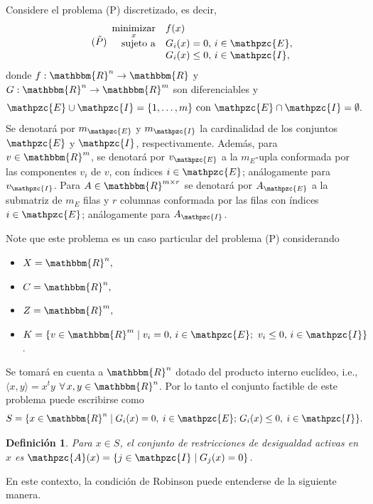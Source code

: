 \documentclass[a4paper,10pt]{book}
\newcommand{\R}{\mathbbm{R}}
\newcommand{\Rn}{\R^n}
\newcommand{\arr}{\rightarrow}
\newcommand{\cI}{\mathpzc{I}}
\newcommand{\cE}{\mathpzc{E}}
\newcommand{\cA}{\mathpzc{A}}
\newcommand{\la}{\langle}
\newcommand{\ra}{\rangle}
\newtheorem{defi}[teo]{Definici\'on}
\begin{document}
Considere el problema (P) discretizado, es decir,
\[\tag{$\tilde{P}$}
\begin{array}{rl}
\displaystyle \mathop{\mathrm{minimizar}}_{x} & \displaystyle f(x) \\
\mathrm{sujeto \ a} & G_i(x)=0, \, i\in \cE,\\
                    & G_i(x)\leq 0, \, i\in \cI,
\end{array}
\]
donde $f:\R^n\arr\R$ y $G:\R^n\arr\R^m$ son diferenciables y $$\cE\cup \cI=\{1,\ldots,m\}\mbox{ con } \cE\cap \cI=\emptyset.$$
Se denotará por $m_\cE$ y $m_\cI$ la cardinalidad de los conjuntos $\cE$ y $\cI$, respectivamente. Además, para $v\in\R^m$, se denotará por $v_\cE$ a la $m_E$-upla conformada por las componentes $v_i$ de $v$, con índices $i\in \cE$; análogamente para $v_\cI$. Para $A\in\R^{m\times r}$ se denotará por $A_\cE$ a la submatriz de $m_E$ filas y $r$ columnas conformada por las filas con índices $i\in \cE$; análogamente para $A_\cI$.


Note que este problema es un caso particular del problema (P) considerando
\begin{itemize}
    \item $X=\Rn,$
    \item $C=\Rn,$
    \item $Z=\R^m,$
    \item $K=\{v\in\R^m\mid v_i=0,\,i\in\cE;\ v_i\leq 0,\,i\in \cI\}$.
\end{itemize}
Se tomará en cuenta a $\Rn$ dotado del producto interno euclídeo, i.e., $\la x,y\ra=x^ty$ $\forall\, x,y\in\Rn$. 
Por lo tanto el conjunto factible de este problema puede escribirse como
\[
 S=\{x\in\Rn \mid G_i(x)=0,\; i\in\cE;\, G_i(x)\leq0,\; i\in\cI\}.
\]


\begin{defi}
Para $x\in S$, el conjunto de restricciones de desigualdad activas en $x$ es $\cA(x)=\{j\in\cI \mid G_j(x)=0\}$.
\end{defi}

En este contexto, la condición de Robinson puede entenderse de la siguiente manera.
\end{document}
